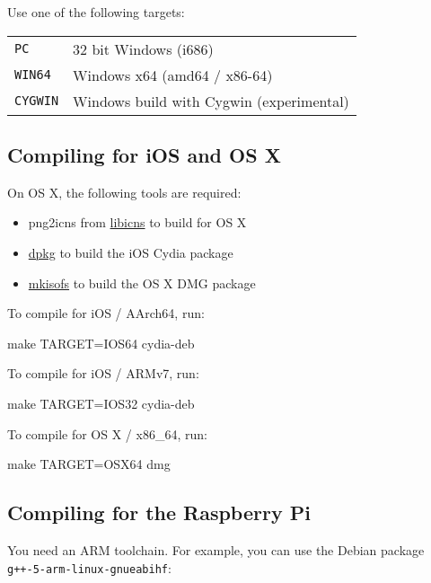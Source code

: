 Use one of the following targets:

\begin{tabularx}{1.9\textwidth}{lX}

\texttt{PC} & 32 bit Windows (i686) \\

\texttt{WIN64} & Windows x64 (amd64 / x86-64) \\

\texttt{CYGWIN} & Windows build with Cygwin (experimental) \\

\end{tabularx}

\subsection{Compiling for iOS and OS X}

On OS X, the following tools are required:
\begin{itemize}
\item png2icns from \href{http://icns.sourceforge.net}{libicns} to build for
  OS X
\item \href{https://alioth.debian.org/projects/dpkg}{dpkg} to build the iOS
  Cydia package
\item \href{http://cdrecord.org/private/cdrecord.html}{mkisofs} to build the
  OS X DMG package
\end{itemize}

To compile for iOS / AArch64, run:

\begin{verbatim*}
make TARGET=IOS64 cydia-deb
\end{verbatim*}

To compile for iOS / ARMv7, run:

\begin{verbatim*}
make TARGET=IOS32 cydia-deb
\end{verbatim*}

To compile for OS X / x86\_64, run:

\begin{verbatim*}
make TARGET=OSX64 dmg
\end{verbatim*}

\subsection{Compiling for the Raspberry Pi}

You need an ARM toolchain.  For example, you can use the Debian
package \verb|g++-5-arm-linux-gnueabihf|:

